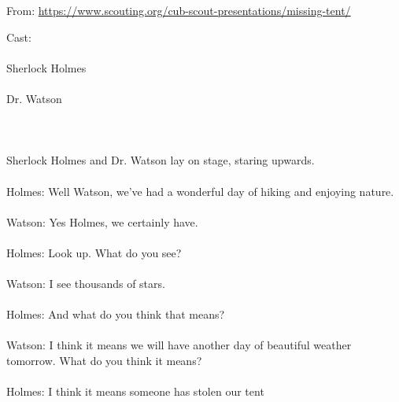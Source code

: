 
From: \url{https://www.scouting.org/cub-scout-presentations/missing-tent/}

Cast:\\
\\
Sherlock Holmes\\
\\
Dr. Watson\\
\\
 \\
\\
Sherlock Holmes and Dr. Watson lay on stage, staring upwards.\\
\\
Holmes: Well Watson, we’ve had a wonderful day of hiking and enjoying nature.\\
\\
Watson: Yes Holmes, we certainly have.\\
\\
Holmes: Look up.  What do you see?\\
\\
Watson: I see thousands of stars.\\
\\
Holmes: And what do you think that means?\\
\\
Watson: I think it means we will have another day of beautiful weather tomorrow.  What do you think it means?\\
\\
Holmes: I think it means someone has stolen our tent\\
\\
